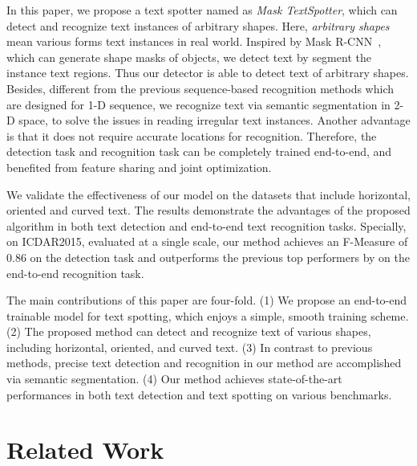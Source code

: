 \documentclass[runningheads]{llncs}
\begin{document}
In this paper, we propose a text spotter named as \emph{Mask TextSpotter}, which can detect and recognize text instances of arbitrary shapes. Here, \textit{arbitrary shapes} mean various forms text instances in real world. Inspired by Mask R-CNN~\cite{he2017mask}, which can generate shape masks of objects, we detect text by segment the instance text regions. Thus our detector is able to detect text of arbitrary shapes. Besides, different from the previous sequence-based recognition methods \cite{shi2016robust,shi2017end,lee2016recursive} which are designed for 1-D sequence, we recognize text via semantic segmentation in 2-D space, to solve the issues in reading irregular text instances. Another advantage is that it does not require accurate locations for recognition. Therefore, the detection task and recognition task can be completely trained end-to-end, and benefited from feature sharing and joint optimization.

We validate the effectiveness of our model on the datasets that include horizontal, oriented and curved text. The results demonstrate the advantages of the proposed algorithm in both text detection and end-to-end text recognition tasks. Specially, on ICDAR2015, evaluated at a single scale, our method achieves an F-Measure of 0.86 on the detection task and outperforms the previous top performers by  on the end-to-end recognition task.

The main contributions of this paper are four-fold. (1) We propose an end-to-end trainable model for text spotting, which enjoys a simple, smooth training scheme. (2) The proposed method can detect and recognize text of various shapes, including horizontal, oriented, and curved text. (3) In contrast to previous methods, precise text detection and recognition in our method are accomplished via semantic segmentation. (4) Our method achieves state-of-the-art performances in both text detection and text spotting on various benchmarks.

\section{Related Work}
\end{document}
